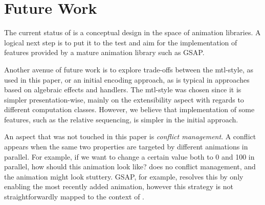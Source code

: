 \section{Future Work}
\label{sec:future}

The current status of \dsl{} is a conceptual design in the space of animation libraries. A logical next step is to put it to the test and aim for the implementation of features provided by a mature animation library such as GSAP.

Another avenue of future work is to explore trade-offs between the mtl-style, as used in this paper, or an initial encoding approach, as is typical in approaches based on algebraic effects and handlers. The mtl-style was chosen since it is simpler presentation-wise, mainly on the extensibility aspect with regards to different computation classes. However, we believe that implementation of some features, such as the relative sequencing, is simpler in the initial approach.

An aspect that was not touched in this paper is \emph{conflict management}. A conflict appears when the same two properties are targeted by different animations in parallel. For example, if we want to change a certain value both to 0 and 100 in parallel, how should this animation look like? \dsl{} does no conflict management, and the animation might look stuttery. GSAP, for example, resolves this by only enabling the most recently added animation, however this strategy is not straightforwardly mapped to the context of \dsl{}.
